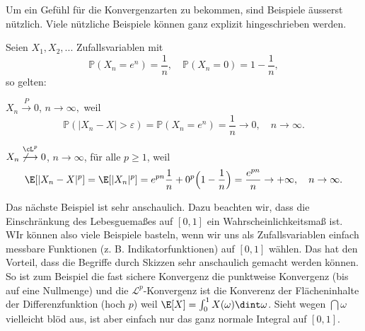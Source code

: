Um ein Gef\"uhl f\"ur die Konvergenzarten zu bekommen, sind Beispiele \"ausserst n\"utzlich. Viele n\"utzliche Beispiele k\"onnen ganz explizit hingeschrieben werden.
\begin{beispiel}
	Seien $X_1, X_2, ... $ Zufallsvariablen mit $$\mathbb{P}(X_n = e^n) = \frac{1}{n}, \quad \mathbb{P}(X_n = 0) = 1 - \frac{1}{n},$$ so gelten:\smallskip
	
	$X_n \overset{P}{\longrightarrow} 0$, $n \to \infty,$ weil $$\mathbb{P}(|X_n - X| > \varepsilon) = \mathbb{P}(X_n = e^n)=\frac{1}{n}\to 0, \quad n\to\infty.$$
	
	$X_n \overset{\cL^p}{\not\longrightarrow} 0$, $n \to \infty$, f\"ur alle $p\geq 1$, weil 
	$$\E[|X_n - X|^p] = \E[|X_n|^p] = e^{pn} \frac{1}{n} + 0^p\Big(1-\frac{1}{n}\Big) = \frac{e^{pn}}{n} \to +\infty,\quad n\to\infty.$$
\end{beispiel}
Das n\"achste Beispiel ist sehr anschaulich. Dazu beachten wir, dass die Einschr\"ankung des Lebesguema\ss es auf $[0,1]$ ein Wahrscheinlichkeitsma\ss{} ist. WIr k\"onnen also viele Beispiele basteln, wenn wir uns als Zufallsvariablen einfach messbare Funktionen (z. B. Indikatorfunktionen) auf $[0,1]$ w\"ahlen. Das hat den Vorteil, dass die Begriffe durch Skizzen sehr anschaulich gemacht werden k\"onnen. So ist zum Beispiel die fast sichere Konvergenz die punktweise Konvergenz (bis auf eine Nullmenge) und die $\mathcal L^p$-Konvergenz ist die Konverenz der Fl\"acheninhalte der Differenzfunktion (hoch $p$) weil $\E[X]=\int_0^1 X(\omega)\dint \omega$. Sieht wegen $\dint \omega$ vielleicht bl\"od aus, ist aber einfach nur das ganz normale Integral auf $[0,1]$.
